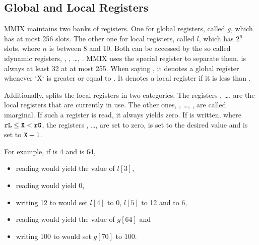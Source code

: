 \subsection{Global and Local Registers}

MMIX maintains two banks of registers. One for global registers, called $g$, which has at most 256 slots. The other one for local registers, called $l$, which has $2^n$ slots, where $n$ is between 8 and 10. Both can be accessed by the so called \i{dynamic registers}, , , \dots, . MMIX uses the special register  to separate them.  is always at least 32 at at most 255. When saying , it denotes a global register whenever `X` is greater or equal to . It denotes a local register if it is less than . \citep[pg. 22]{mmix-doc}

Additionally,  splits the local registers in two categories. The registers , \dots,  are the local registers that are currently in use. The other ones, , \dots, , are called \i{marginal}. If such a register is read, it always yields zero. If  is written, where ${\tt rL} \le {\tt X} < {\tt rG}$, the registers , \dots,  are set to zero,  is set to the desired value and  is set to ${\tt X} + 1$. \citep[pg. 22]{mmix-doc}

For example, if  is 4 and  is 64,
\begin{itemize}
	\item reading  would yield the value of $l[3]$,
	\item reading  would yield 0,
	\item writing 12 to  would set $l[4]$ to 0, $l[5]$ to 12 and  to 6,
	\item reading  would yield the value of $g[64]$ and
	\item writing 100 to  would set $g[70]$ to 100.
\end{itemize}

